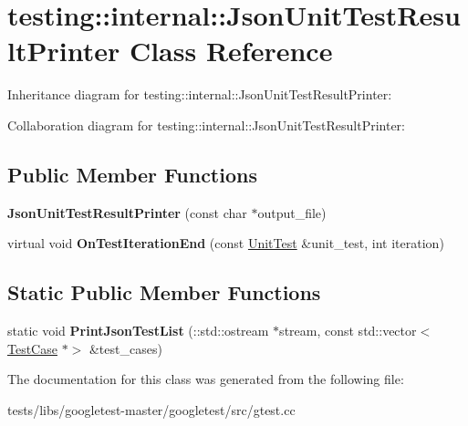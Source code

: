 \hypertarget{classtesting_1_1internal_1_1JsonUnitTestResultPrinter}{}\section{testing\+:\+:internal\+:\+:Json\+Unit\+Test\+Result\+Printer Class Reference}
\label{classtesting_1_1internal_1_1JsonUnitTestResultPrinter}


Inheritance diagram for testing\+:\+:internal\+:\+:Json\+Unit\+Test\+Result\+Printer\+:


Collaboration diagram for testing\+:\+:internal\+:\+:Json\+Unit\+Test\+Result\+Printer\+:
\subsection*{Public Member Functions}
\begin{DoxyCompactItemize}
\item 
\mbox{\label{classtesting_1_1internal_1_1JsonUnitTestResultPrinter_a273623decde1be18db45e95594f9d501}} 
{\bfseries Json\+Unit\+Test\+Result\+Printer} (const char $\ast$output\+\_\+file)
\item 
\mbox{\label{classtesting_1_1internal_1_1JsonUnitTestResultPrinter_a44edb54cf1ab8cdcd56bda5058b8f1d6}} 
virtual void {\bfseries On\+Test\+Iteration\+End} (const \hyperlink{classtesting_1_1UnitTest}{Unit\+Test} \&unit\+\_\+test, int iteration)
\end{DoxyCompactItemize}
\subsection*{Static Public Member Functions}
\begin{DoxyCompactItemize}
\item 
\mbox{\label{classtesting_1_1internal_1_1JsonUnitTestResultPrinter_a5f2b7e7c90cbdd2029ddaa6c1ad75de0}} 
static void {\bfseries Print\+Json\+Test\+List} (\+::std\+::ostream $\ast$stream, const std\+::vector$<$ \hyperlink{classtesting_1_1TestCase}{Test\+Case} $\ast$$>$ \&test\+\_\+cases)
\end{DoxyCompactItemize}


The documentation for this class was generated from the following file\+:\begin{DoxyCompactItemize}
\item 
tests/libs/googletest-\/master/googletest/src/gtest.\+cc\end{DoxyCompactItemize}
